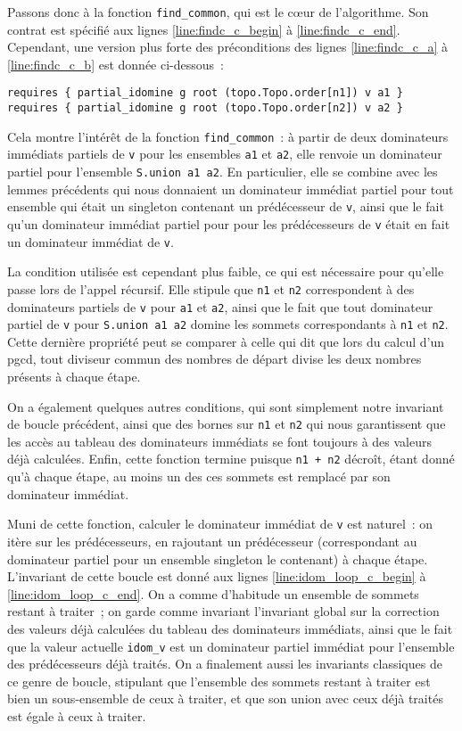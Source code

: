 \documentclass[a4paper,10pt]{article}
\begin{document}
Passons donc à la fonction \lstinline{find_common}, qui est le cœur de l'algorithme. Son contrat est spécifié aux lignes \ref{line:findc_c_begin} à \ref{line:findc_c_end}. Cependant, une version plus forte des préconditions des lignes \ref{line:findc_c_a} à \ref{line:findc_c_b} est donnée ci-dessous~:
\begin{lstlisting}
requires { partial_idomine g root (topo.Topo.order[n1]) v a1 }
requires { partial_idomine g root (topo.Topo.order[n2]) v a2 }
\end{lstlisting}

Cela montre l'intérêt de la fonction \lstinline{find_common}~: à partir de deux dominateurs immédiats partiels de \lstinline{v} pour les ensembles \lstinline{a1} et \lstinline{a2}, elle renvoie un dominateur partiel pour l'ensemble \lstinline{S.union a1 a2}. En particulier, elle se combine avec les lemmes précédents qui nous donnaient un dominateur immédiat partiel pour tout ensemble qui était un singleton contenant un prédécesseur de \lstinline{v}, ainsi que le fait qu'un dominateur immédiat partiel pour pour les prédécesseurs de \lstinline{v} était en fait un dominateur immédiat de \lstinline{v}.

La condition utilisée est cependant plus faible, ce qui est nécessaire pour qu'elle passe lors de l'appel récursif. Elle stipule que \lstinline{n1} et \lstinline{n2} correspondent à des dominateurs partiels de \lstinline{v} pour \lstinline{a1} et \lstinline{a2}, ainsi que le fait que tout dominateur partiel de \lstinline{v} pour \lstinline{S.union a1 a2} domine les sommets correspondants à \lstinline{n1} et \lstinline{n2}. Cette dernière propriété peut se comparer à celle qui dit que lors du calcul d'un pgcd, tout diviseur commun des nombres de départ divise les deux nombres présents à chaque étape.

On a également quelques autres conditions, qui sont simplement notre invariant de boucle précédent, ainsi que des bornes sur \lstinline{n1} et \lstinline{n2} qui nous garantissent que les accès au tableau des dominateurs immédiats se font toujours à des valeurs déjà calculées. Enfin, cette fonction termine puisque \lstinline{n1 + n2} décroît, étant donné qu'à chaque étape, au moins un des ces sommets est remplacé par son dominateur immédiat.

Muni de cette fonction, calculer le dominateur immédiat de \lstinline{v} est naturel~: on itère sur les prédécesseurs, en rajoutant un prédécesseur (correspondant au dominateur partiel pour un ensemble singleton le contenant) à chaque étape. L'invariant de cette boucle est donné aux lignes \ref{line:idom_loop_c_begin} à \ref{line:idom_loop_c_end}. On a comme d'habitude un ensemble de sommets restant à traiter~; on garde comme invariant l'invariant global sur la correction des valeurs déjà calculées du tableau des dominateurs immédiats, ainsi que le fait que la valeur actuelle \lstinline{idom_v} est un dominateur partiel immédiat pour l'ensemble des prédécesseurs déjà traités. On a finalement aussi les invariants classiques de ce genre de boucle, stipulant que l'ensemble des sommets restant à traiter est bien un sous-ensemble de ceux à traiter, et que son union avec ceux déjà traités est égale à ceux à traiter.
\end{document}
